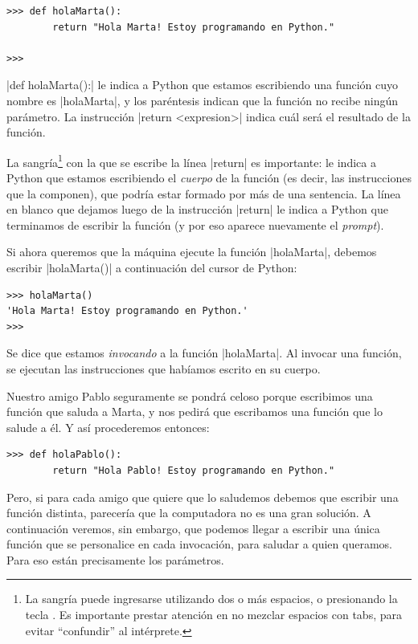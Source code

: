 \begin{lstlisting}[numbers=none]
>>> def holaMarta():
        return "Hola Marta! Estoy programando en Python."

>>>
\end{lstlisting}

|def holaMarta():| le indica a Python que estamos escribiendo una función cuyo
nombre es |holaMarta|, y los paréntesis indican que la función no recibe ningún
parámetro.  La instrucción |return <expresion>| indica cuál será el resultado
de la función.

La sangría\footnote{La sangría puede ingresarse utilizando dos o más espacios,
o presionando la tecla . Es importante prestar atención en no mezclar
espacios con tabs, para evitar ``confundir'' al intérprete.} con la que se
escribe la línea |return| es importante: le indica a Python que estamos
escribiendo el {\it cuerpo} de la función (es decir, las instrucciones que la
componen), que podría estar formado por más de una sentencia.  La línea en
blanco que dejamos luego de la instrucción |return| le indica a Python que
terminamos de escribir la función (y por eso aparece nuevamente el {\it
prompt}).

Si ahora queremos que la máquina ejecute la función |holaMarta|, debemos
escribir |holaMarta()| a continuación del cursor de Python:

\begin{lstlisting}[numbers=none]
>>> holaMarta()
'Hola Marta! Estoy programando en Python.'
>>>
\end{lstlisting}

Se dice que estamos {\it invocando} a la función |holaMarta|.  Al invocar una
función, se ejecutan las instrucciones que habíamos escrito en su cuerpo.

Nuestro amigo Pablo seguramente se pondrá celoso porque escribimos
una función que saluda a Marta, y nos pedirá que escribamos una
función que lo salude a él. Y así procederemos entonces:

\begin{lstlisting}[numbers=none]
>>> def holaPablo():
        return "Hola Pablo! Estoy programando en Python."
\end{lstlisting}

Pero, si para cada amigo que quiere que lo saludemos debemos que
escribir una función distinta, parecería que la computadora no es
una gran solución. A continuación veremos, sin embargo, que
podemos llegar a escribir una única función que se personalice en
cada invocación, para saludar a quien queramos. Para eso están
precisamente los parámetros.

